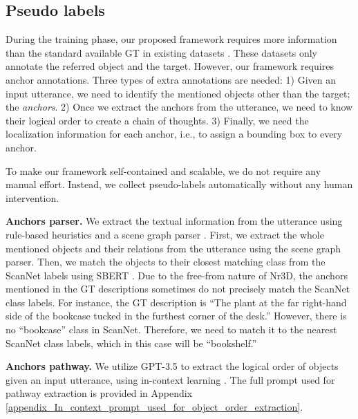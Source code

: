 \subsection{Pseudo labels}
\label{sec_pseudo_labels}

During the training phase, our proposed framework requires more information than the standard available GT in existing datasets \citep{achlioptas2020referit3d, chen2020scanrefer}. These datasets only annotate the referred object and the target. However, our framework requires anchor annotations.
Three types of extra annotations are needed:
1) Given an input utterance, we need to identify the mentioned objects other than the target; the \textit{anchors}.
2) Once we extract the anchors from the utterance, we need to know their logical order to create a chain of thoughts.
3) Finally, we need the localization information for each anchor, i.e., to assign a bounding box to every anchor.

To make our framework self-contained and scalable, we do not require any manual effort. Instead, we collect pseudo-labels automatically without any human intervention.

\noindent \textbf{Anchors parser.}
We extract the textual information from the utterance using rule-based heuristics and a scene graph parser \citep{schuster-etal-2015-generating, wu2022eda}.
First, we extract the whole mentioned objects and their relations from the utterance using the scene graph parser. 
Then, we match the objects to their closest matching class from the ScanNet labels \citep{dai2017scannet} using SBERT \citep{reimers2019sentence}.
Due to the free-from nature of Nr3D, the anchors mentioned in the GT descriptions sometimes do not precisely match the ScanNet class labels.
For instance, the GT description is “The plant at the far right-hand side of the bookcase tucked in the furthest corner of the desk.” However, there is no “bookcase” class in ScanNet.
Therefore, we need to match it to the nearest ScanNet class labels, which in this case will be “bookshelf.”

\noindent \textbf{Anchors pathway.}
We utilize GPT-3.5 \citep{ouyang2022training} to extract the logical order of objects given an input utterance, using in-context learning \citep{brown2020gpt3}.
The full prompt used for pathway extraction is provided in Appendix \ref{appendix_In_context_prompt_used_for_object_order_extraction}.

